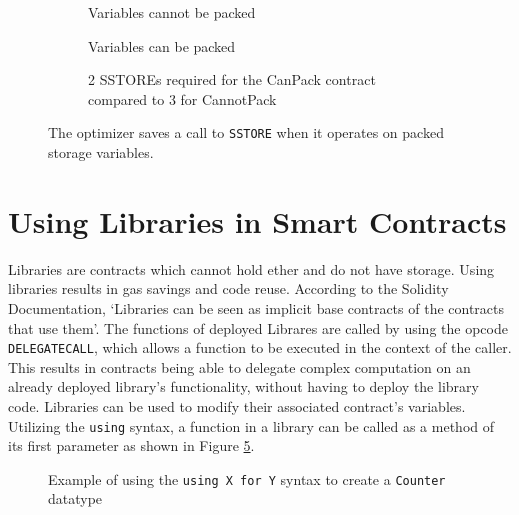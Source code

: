 \begin{figure}[htb]
  \begin{subfigure}[b]{\textwidth}
    \centering
    
    \caption{Variables cannot be packed}
    \label{fig:optimizer:a}
  \end{subfigure}

  \begin{subfigure}[b]{\textwidth}
    \centering
    
    \caption{Variables can be packed}
    \label{fig:optimizer:b}
  \end{subfigure}

  \begin{subfigure}[b]{\textwidth}
    \centering
    
    \caption{2 SSTOREs required for the CanPack contract compared to 3 for CannotPack}
    \label{fig:optimizer:c}
  \end{subfigure}

  \caption{The optimizer saves a call to \texttt{SSTORE} when it operates on packed storage variables.} 
  \label{fig:optimizer}
\end{figure}

\section{Using Libraries in Smart Contracts}

Libraries are contracts which cannot hold ether and do not have storage. Using libraries results in gas savings and code reuse. According to the Solidity Documentation, `Libraries can be seen as implicit base contracts of the contracts that use them'. The functions of deployed Librares are called by using the opcode \texttt{DELEGATECALL}, which allows a function to be executed in the context of the caller. This results in contracts being able to delegate complex computation on an already deployed library's functionality, without having to deploy the library code. Libraries can be used to modify their associated contract's variables. Utilizing the \texttt{using} syntax, a function in a library can be called as a method of its first parameter as shown in Figure \ref{fig:usingfor}.

\begin{figure}[htb]
    \centering
    
    \caption{Example of using the \texttt{using X for Y} syntax to create a \texttt{Counter} datatype~\cite{library}}
    \label{fig:usingfor}
\end{figure}

